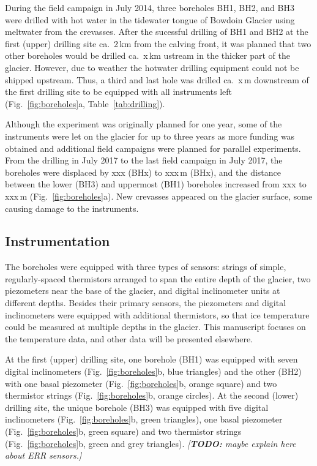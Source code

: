 \documentclass[utf8]{article}
\newcommand{\todo}[1]{\textcolor{c3}{\emph{[\textbf{TODO:} #1]}}}
\begin{document}
    During the field campaign in July 2014, three boreholes BH1, BH2, and BH3
    were drilled with hot water in the tidewater tongue of Bowdoin Glacier
    using meltwater from the crevasses. After the sucessful drilling of BH1
    and BH2 at the first (upper) drilling site ca.~2\,km from the calving
    front, it was planned that two other boreholes would be drilled ca.~x\,km
    ustream in the thicker part of the glacier. However, due to weather the
    hotwater drilling equipment could not be shipped upstream. Thus, a third
    and last hole was drilled ca.~x\,m downstream of the first drilling site
    to be equipped with all instruments left (Fig.~\ref{fig:boreholes}a,
    Table~\ref{tab:drilling}).

    Although the experiment was originally planned for one year, some of the
    instruments were let on the glacier for up to three years as more funding
    was obtained and additional field campaigns were planned for parallel
    experiments. From the drilling in July 2017 to the last field campaign in
    July 2017, the boreholes were displaced by xxx (BHx) to xxx\,m (BHx), and
    the distance between the lower (BH3) and uppermost (BH1) boreholes
    increased from xxx to xxx\,m (Fig.~\ref{fig:boreholes}a). New crevasses
    appeared on the glacier surface, some causing damage to the instruments.


\subsection{Instrumentation}

    The boreholes were equipped with three types of sensors: strings of simple,
    regularly-spaced thermistors arranged to span the entire depth of the
    glacier, two piezometers near the base of the glacier, and digital
    inclinometer units at different depths. Besides their primary sensors, the
    piezometers and digital inclinometers were equipped with additional
    thermistors, so that ice temperature could be measured at multiple depths
    in the glacier. This manuscript focuses on the temperature data, and other
    data will be presented elsewhere.

    At the first (upper) drilling site, one borehole (BH1) was equipped with
    seven digital inclinometers (Fig.~\ref{fig:boreholes}b, blue triangles) and
    the other (BH2) with one basal piezometer (Fig.~\ref{fig:boreholes}b,
    orange square) and two thermistor strings (Fig.~\ref{fig:boreholes}b,
    orange circles). At the second (lower) drilling site, the unique
    borehole (BH3) was equipped with five digital inclinometers
    (Fig.~\ref{fig:boreholes}b, green triangles), one basal piezometer
    (Fig.~\ref{fig:boreholes}b, green square) and two thermistor strings
    (Fig.~\ref{fig:boreholes}b, green and grey triangles).
    \todo{maybe explain here about ERR sensors.}
\end{document}
